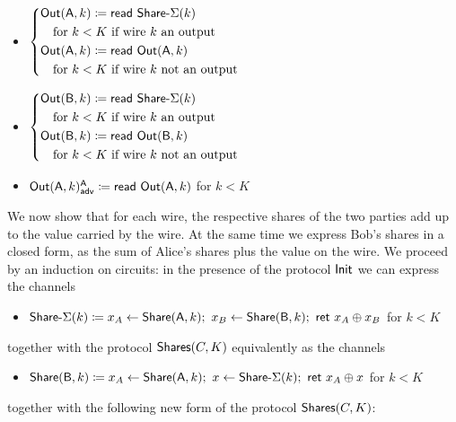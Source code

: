 \begin{itemize}
\item $\begin{cases*} \Out(\A,k) \coloneqq \read{\SumShare(k)} \\ \hspace{10pt} \text{for $k < K$ if wire $k$ an output} \\ \Out(\A,k) \coloneqq \read{\Out(\A,k)} \\ \hspace{10pt} \text{for $k < K$ if wire $k$ not an output} \end{cases*}$
\item $\begin{cases*} \Out(\B,k) \coloneqq \read{\SumShare(k)} \\ \hspace{10pt} \text{for $k < K$ if wire $k$ an output} \\ \Out(\B,k) \coloneqq \read{\Out(\B,k)} \\ \hspace{10pt} \text{for $k < K$ if wire $k$ not an output} \end{cases*}$
\item {\color{blue} $\mathsf{Out}(\mathsf{A},k)^{\mathsf{A}}_{\mathsf{adv}} \coloneqq \mathsf{read} \ \mathsf{Out}(\mathsf{A},k)$ for $k < K$}
\end{itemize}

\noindent We now show that for each wire, the respective shares of the two parties add up to the value carried by the wire. At the same time we express Bob's shares in a closed form, as the sum of Alice's shares plus the value on the wire. We proceed by an induction on circuits: in the presence of the protocol $\mathsf{Init}$ we can express the channels
\begin{itemize}
\item $\mathsf{Share}\textsf{-}\Sigma(k) \coloneqq x_A \leftarrow \mathsf{Share}(\mathsf{A},k); \ x_B \leftarrow \mathsf{Share}(\mathsf{B},k); \ \mathsf{ret} \ x_A \oplus x_B$ for $k < K$
\end{itemize}
together with the protocol $\mathsf{Shares}(C,K)$ equivalently as the channels
\begin{itemize}
\item $\mathsf{Share}(\mathsf{B},k) \coloneqq x_A \leftarrow \mathsf{Share}(\mathsf{A},k); \ x \leftarrow \mathsf{Share}\textsf{-}\Sigma(k); \ \mathsf{ret} \ x_A \oplus x$ for $k < K$
\end{itemize}
together with the following new form of the protocol $\mathsf{Shares}(C,K)$:

